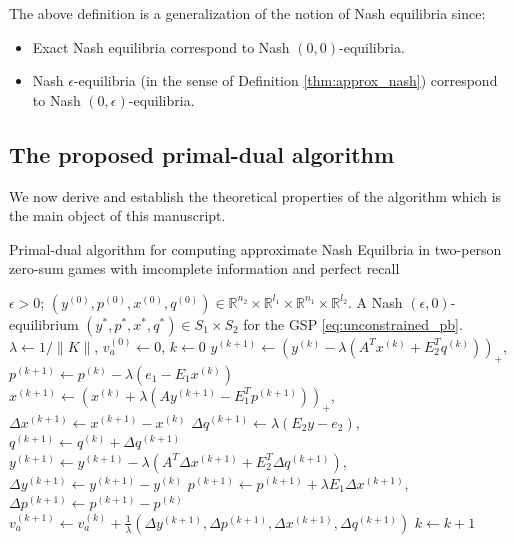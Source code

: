 \documentclass{article} %
\begin{document}
The above definition is a generalization of the notion of Nash
equilibria since:
\begin{itemize}
\item Exact Nash equilibria correspond to Nash $(0,0)$-equilibria.
\item Nash $\epsilon$-equilibria (in the sense of Definition
  \ref{thm:approx_nash}) correspond to Nash $(0,\epsilon)$-equilibria.
\end{itemize}


\subsection{The proposed primal-dual algorithm}
\label{sec:algo}
We now derive and establish the theoretical properties of the
algorithm which is the main object of this manuscript.

\begin{algorithm}
\caption{Primal-dual algorithm for computing approximate Nash
  Equilbria in two-person zero-sum games with imcomplete information
  and perfect recall}
\label{Tab:algo}
\begin{algorithmic}[1]
\Require $\epsilon > 0$; $(y^{(0)},p^{(0)},x^{(0)},q^{(0)})
\in \mathbb{R}^{n_2}
  \times \mathbb{R}^{l_1} \times \mathbb{R}^{n_1} \times
  \mathbb{R}^{l_2}$.
\Ensure A Nash $(\epsilon,0)$-equilibrium
$({y^*},{p^*},{x^*},{q^*}) \in S_1 \times S_2$ for
the GSP \eqref{eq:unconstrained_pb}.
\State  $\lambda \leftarrow 1/\|K\|$, ${v}_a^{(0)} \leftarrow 0$, $k
\leftarrow 0$
\State $y^{(k + 1)} \leftarrow (y^{(k)} - \lambda (A^Tx^{(k)} +
E_2^Tq^{(k)}))_+$, \hspace{.5em}$p^{(k+1)} \leftarrow p^{(k)} -
\lambda(e_1-E_1x^{(k)})$
\State $x^{(k + 1)} \leftarrow (x^{(k)} + \lambda (Ay^{(k+1)} -
E_1^Tp^{(k+1)}))_+$, \hspace{.5em}$\Delta x^{(k+1)} \leftarrow
x^{(k+1)}-x^{(k)}$
\State $\Delta q^{(k+1)} \leftarrow \lambda (E_2y -
e_2)$, \hspace{.5em}$q^{(k+1)} \leftarrow q^{(k)} + \Delta q^{(k+1)}$
\State $y^{(k+1)} \leftarrow y^{(k+1)} - \lambda (A^T\Delta x^{(k+1)}
+ E_2^T\Delta q^{(k+1)})$, \hspace{.5em}$\Delta y^{(k+1)} \leftarrow
y^{(k+1)}-y^{(k)}$
\State $p^{(k+1)} \leftarrow p^{(k+1)} + \lambda E_1\Delta x^{(k+1)}$,
\hspace{.5em} $\Delta p^{(k+1)} \leftarrow p^{(k+1)}-p^{(k)}$
\State ${v}_a^{(k+1)} \leftarrow {v}_a^{(k)} +
\frac{1}{\lambda}(\Delta
y^{(k+1)},\Delta p^{(k+1)},\Delta x^{(k+1)},\Delta q^{(k+1)})$
\State $k \leftarrow k + 1$
\EndWhile
\end{algorithmic}
\end{algorithm}
\end{document}
